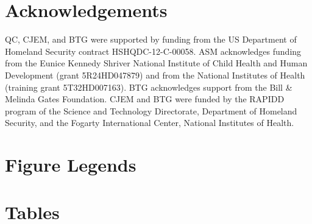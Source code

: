 \documentclass[10pt]{article}
\begin{document}
\section*{Acknowledgements}

QC, CJEM, and BTG were supported by funding from the US Department of Homeland Security contract HSHQDC-12-C-00058. ASM acknowledges funding from the Eunice Kennedy Shriver National Institute of Child Health and Human Development (grant 5R24HD047879) and from the National Institutes of Health (training grant 5T32HD007163). BTG acknowledges support from the Bill \& Melinda Gates Foundation. CJEM and BTG were funded by the RAPIDD program of the Science and Technology Directorate, Department of Homeland Security, and the Fogarty International Center, National Institutes of Health. 










\section*{Figure Legends}


\section*{Tables}
\end{document}
